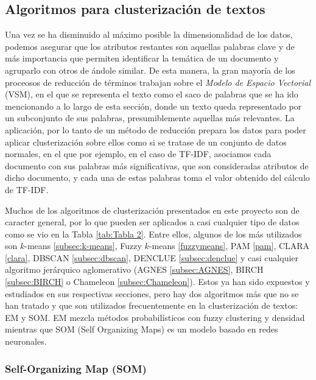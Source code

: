 \documentclass[10pt, a4paper]{article}
\begin{document}
\subsection{Algoritmos para clusterización de textos}

Una vez se ha disminuido al máximo posible la dimensionalidad de los datos, podemos asegurar que los atributos restantes son aquellas palabras clave y de más importancia que permiten identificar la temática de un documento y agruparlo con otros de ándole similar. De esta manera, la gran mayoría de los proceosos de reducción de términos trabajan sobre el \textit{Modelo de Espacio Vectorial} (VSM), en el que se representa el texto como el saco de palabras que se ha ido mencionando a lo largo de esta sección, donde un texto queda representado por un subconjunto de sus palabras, presumiblemente aquellas más relevantes. La aplicación, por lo tanto de un método de reducción prepara los datos para poder aplicar clusterización sobre ellos como si se tratase de un conjunto de datos normales, en el que por ejemplo, en el caso de TF-IDF, asociamos cada documento con sus palabras más significativas, que son consideradas atributos de dicho documento, y cada una de estas palabras toma el valor obtenido del cálculo de TF-IDF.

Muchos de los algoritmos de clusterización presentados en este proyecto son de caracter general, por lo que pueden ser aplicados a casi cualquier tipo de datos como se vio en la Tabla \ref{tab:Tabla 2}. Entre ellos, algunos de los más utilizados son $k$-means \ref{subsec:k-means}, Fuzzy $k$-means \ref{fuzzymeans}, PAM \ref{pam}, CLARA \ref{clara}, DBSCAN \ref{subsec:dbscan}, DENCLUE \ref{subsec:denclue} y casi cualquier algoritmo jerárquico aglomerativo (AGNES \ref{subsec:AGNES}, BIRCH \ref{subsec:BIRCH} o Chameleon \ref{subsec:Chameleon}). Estos ya han sido expuestos y estudiados en sus respectivas secciones, pero hay dos algoritmos más que no se han tratado y que son utilizados frecuentemente en la clusterización de textos: EM y SOM. EM mezcla métodos probabilísticos con fuzzy clustering y densidad mientras que SOM (Self Organizing Maps) es un modelo basado en redes neuronales.


\subsubsection{Self-Organizing Map (SOM)}
\end{document}
